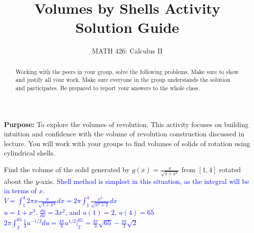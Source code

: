 \documentclass{ximera}
\title{Volumes by Shells Activity Solution Guide}
\author{MATH 426: Calculus II}
\begin{document}
\begin{abstract}
   Working with the peers in your group, solve the following problems. Make sure to show and justify all your work. Make sure everyone in the group understands the solution and participates. Be prepared to report your answers to the whole class. 
\end{abstract}
\maketitle
\textbf{Purpose: }To explore the volumes of revolution. This activity focuses on building intuition and confidence with the volume of revolution construction discussed in lecture. You will work with your groups to find volumes of solids of rotation using cylindrical shells.\\

\begin{exercise}
    Find the volume of the solid generated by $g(x)=\frac{x}{\sqrt{1+x^3}}$ from $[1,4]$ rotated about the $y$-axis.
    \textcolor{blue}{{Shell method is simplest in this situation, as the integral will be in terms of $x$. \\
$V=\displaystyle \int_1^4 2\pi x\frac{x}{\sqrt{1+x^3}}dx=2\pi\int_1^4 \frac{x^2}{\sqrt{x^3+1}}dx$\\
$u=1+x^3$. $\frac{du}{dx}=3x^2$, and $u(1)=2$, $u(4)=65$\\
$2\pi \displaystyle \int_2^{65}\frac{1}{3}u^{-1/2}du=\frac{4\pi}{3}u^{1/2}\bigg|_2^{65}=\frac{4\pi}{3}\sqrt{65}-\frac{4\pi}{3}\sqrt{2}$}}
\end{exercise}
\end{document}
